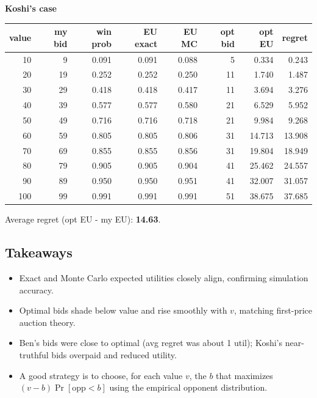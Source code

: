\documentclass[11pt]{article}
\renewenvironment{shaded}{%
  \def\FrameCommand{\fboxsep=\FrameSep \colorbox{shadecolor}}%
  \MakeFramed{\advance\hsize-\width \FrameRestore\FrameRestore}}%
 {\endMakeFramed}
\begin{document}
\begin{shaded}
\newpage

\vspace{1em}
\textbf{Koshi's case}
\begin{center}
\begin{tabular}{@{}rrrrrrrr@{}}
\toprule
value & my bid & win prob & EU exact & EU MC & opt bid & opt EU & regret \\
\midrule
 10 &   9 & 0.091 & 0.091 & 0.088 &  5 & 0.334 & 0.243 \\
 20 &  19 & 0.252 & 0.252 & 0.250 & 11 & 1.740 & 1.487 \\
 30 &  29 & 0.418 & 0.418 & 0.417 & 11 & 3.694 & 3.276 \\
 40 &  39 & 0.577 & 0.577 & 0.580 & 21 & 6.529 & 5.952 \\
 50 &  49 & 0.716 & 0.716 & 0.718 & 21 & 9.984 & 9.268 \\
 60 &  59 & 0.805 & 0.805 & 0.806 & 31 &14.713 &13.908 \\
 70 &  69 & 0.855 & 0.855 & 0.856 & 31 &19.804 &18.949 \\
 80 &  79 & 0.905 & 0.905 & 0.904 & 41 &25.462 &24.557 \\
 90 &  89 & 0.950 & 0.950 & 0.951 & 41 &32.007 &31.057 \\
100 &  99 & 0.991 & 0.991 & 0.991 & 51 &38.675 &37.685 \\
\bottomrule
\end{tabular}
\end{center}
Average regret (opt EU - my EU): \textbf{14.63}.


\subsection*{Takeaways}
\begin{itemize}
\item Exact and Monte Carlo expected utilities closely align, confirming simulation accuracy.  
\item Optimal bids shade below value and rise smoothly with $v$, matching first-price auction theory.  
\item Ben’s bids were close to optimal (avg regret was about 1 util); Koshi’s near-truthful bids overpaid and reduced utility.
\item A good strategy is to choose, for each value $v$, the $b$ that maximizes $(v-b)\Pr[\text{opp}<b]$ using the empirical opponent distribution.  
\end{itemize}
\end{shaded}
\pagebreak
\end{document}
